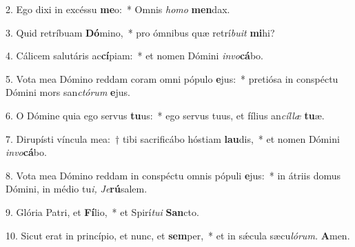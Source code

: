 \item 2. Ego dixi in excéssu \textbf{me}o:~* Omnis \textit{homo} \textbf{men}dax.
\item 3. Quid retríbuam \textbf{Dó}mino,~* pro ómnibus quæ retrí\textit{buit} \textbf{mi}hi?
\item 4. Cálicem salutáris ac\textbf{cí}piam:~* et nomen Dómini \textit{invo}\textbf{cá}bo.
\item 5. Vota mea Dómino reddam coram omni pópulo \textbf{e}jus:~* pretiósa in conspé\-ctu Dómini mors san\textit{ctórum} \textbf{e}jus.
\item 6. O Dómine quia ego servus \textbf{tu}us:~* ego servus tuus, et fílius an\textit{cíllæ} \textbf{tu}æ.
\item 7. Dirupísti víncula mea:~† tibi sacrificábo hóstiam \textbf{lau}dis,~* et nomen Dómini \textit{invo}\textbf{cá}bo.
\item 8. Vota mea Dómino reddam in conspéctu omnis pópuli \textbf{e}jus:~* in átriis domus Dómini, in médio tu\textit{i,} \hspace{0.02em}\textit{Je}\textbf{rú}salem.
\item 9. Glória Patri, et \textbf{Fí}lio,~* et Spirí\textit{tui} \textbf{San}cto.
\item 10. Sicut erat in princípio, et nunc, et \textbf{sem}per,~* et in sǽcula sæcu\textit{lórum.} \textbf{A}men.
